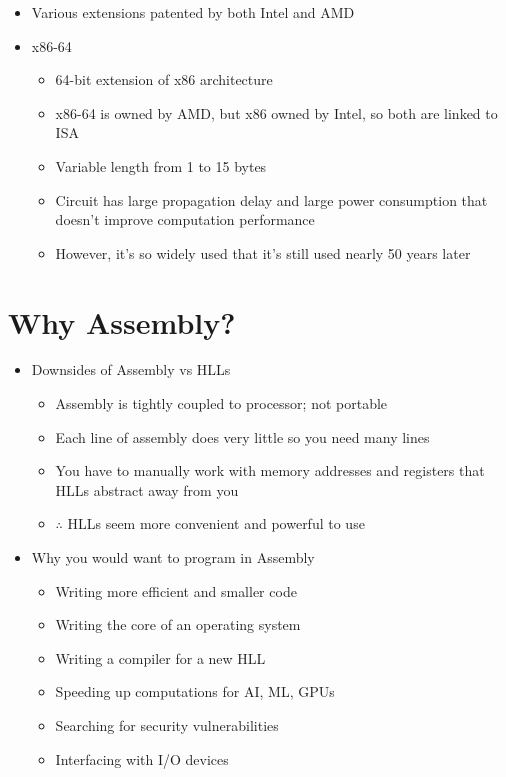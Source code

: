 \documentclass{article}
\begin{document}
\begin{itemize}
\begin{itemize}
			\item Various extensions patented by both Intel and AMD
			\item x86-64
			\begin{itemize}
				\item 64-bit extension of x86 architecture
				\item x86-64 is owned by AMD, but x86 owned by Intel, so both are linked to ISA
				\item Variable length from 1 to 15 bytes
				\item Circuit has large propagation delay and large power consumption that doesn't improve computation performance
				\item However, it's so widely used that it's still used nearly 50 years later
			\end{itemize}
		\end{itemize}
\end{itemize}

\section{Why Assembly?}
\begin{itemize}
	\item Downsides of Assembly vs HLLs
		\begin{itemize}
			\item Assembly is tightly coupled to processor; not portable
			\item Each line of assembly does very little so you need many lines
			\item You have to manually work with memory addresses and registers that HLLs abstract away from you
			\item $\therefore$ HLLs seem more convenient and powerful to use
		\end{itemize}
	\item Why you would want to program in Assembly
		\begin{itemize}
			\item Writing more efficient and smaller code
			\item Writing the core of an operating system
			\item Writing a compiler for a new HLL
			\item Speeding up computations for AI, ML, GPUs
			\item Searching for security vulnerabilities
			\item Interfacing with I/O devices
		\end{itemize}
\end{itemize}
\end{document}
